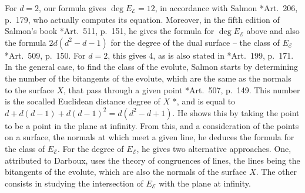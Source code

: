 \documentclass[reqno]{amsart}
\theoremstyle{definition}
\theoremstyle{remark}
\begin{document}
For $d=2$, our formula gives $\deg E_\mathcal E=12$, in accordance with Salmon \cite{Salmon}*{Art.~206, p.~179}, who actually computes its equation. Moreover, in the fifth edition of Salmon's book \cite{Salmon2}*{Art.~511, p.~151}, he gives the formula for $\deg E_\mathcal E$ above and also the formula $2d(d^2-d-1)$  for the degree of the dual surface -- the class of $E_\mathcal E$  \cite{Salmon2}*{Art.~509, p.~150}. 
For $d=2$, this gives 4, as is also stated in \cite{Salmon}*{Art.~199, p.~171}. In the general case, to find the class of the evolute, Salmon starts by determining the number of the bitangents of the evolute, which are the same as the normals to the surface $X$, that pass through a given point \cite{Salmon2}*{Art.~507, p.~149}. This number is the socalled Euclidean distance degree of $X$ \cite{Draisma}*{}, and is equal to $d+d(d-1)+d(d-1)^2=d(d^2-d+1)$. He shows this by taking the point to be a point in the plane at infinity. 
From this, and a consideration of the points on a surface, the normals at which meet a given line, he deduces the formula for the class of $E_\mathcal E$. For the degree of $E_\mathcal E$, he gives two alternative approaches. One, attributed to Darboux,  uses the theory of congruences of lines, the lines being the bitangents of the evolute, which are also the normals of the surface $X$. The other consists in studying the intersection of $E_\mathcal E$ with the plane at infinity.
\end{document}
